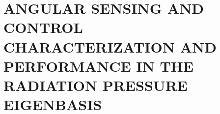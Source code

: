 \chapter{ANGULAR SENSING AND CONTROL CHARACTERIZATION AND PERFORMANCE
  IN THE RADIATION PRESSURE EIGENBASIS}
\label{ch:characterization}











